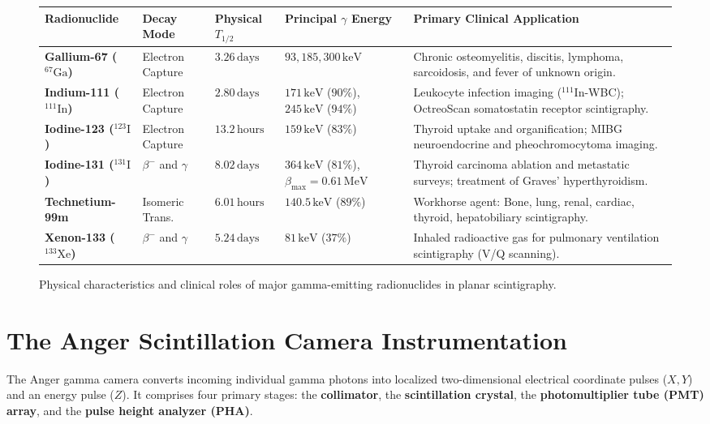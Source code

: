 \documentclass[11pt,a4paper]{article}
\begin{document}
\begin{figure}[htbp]
\centering
\setlength{\tabcolsep}{4pt}
\begin{tabular}{p{2.5cm}p{2.3cm}p{2.1cm}p{2.7cm}p{4.8cm}}
\toprule
\textbf{Radionuclide} & \textbf{Decay Mode} & \textbf{Physical $T_{1/2}$} & \textbf{Principal $\gamma$ Energy} & \textbf{Primary Clinical Application} \\
\midrule
\textbf{Gallium-67 ($^{67}\text{Ga}$)} & Electron Capture & $3.26\,\text{days}$ & $93, 185, 300\,\text{keV}$ & Chronic osteomyelitis, discitis, lymphoma, sarcoidosis, and fever of unknown origin. \\
\addlinespace
\textbf{Indium-111 ($^{111}\text{In}$)} & Electron Capture & $2.80\,\text{days}$ & $171\,\text{keV}$ ($90\%$), $245\,\text{keV}$ ($94\%$) & Leukocyte infection imaging ($^{111}\text{In}$-WBC); OctreoScan somatostatin receptor scintigraphy. \\
\addlinespace
\textbf{Iodine-123 ($^{123}\text{I}$)} & Electron Capture & $13.2\,\text{hours}$ & $159\,\text{keV}$ ($83\%$) & Thyroid uptake and organification; MIBG neuroendocrine and pheochromocytoma imaging. \\
\addlinespace
\textbf{Iodine-131 ($^{131}\text{I}$)} & $\beta^-$ and $\gamma$ & $8.02\,\text{days}$ & $364\,\text{keV}$ ($81\%$), $\beta_{\text{max}} = 0.61\,\text{MeV}$ & Thyroid carcinoma ablation and metastatic surveys; treatment of Graves' hyperthyroidism. \\
\addlinespace
\textbf{Technetium-99m} & Isomeric Trans. & $6.01\,\text{hours}$ & $140.5\,\text{keV}$ ($89\%$) & Workhorse agent: Bone, lung, renal, cardiac, thyroid, hepatobiliary scintigraphy. \\
\addlinespace
\textbf{Xenon-133 ($^{133}\text{Xe}$)} & $\beta^-$ and $\gamma$ & $5.24\,\text{days}$ & $81\,\text{keV}$ ($37\%$) & Inhaled radioactive gas for pulmonary ventilation scintigraphy (V/Q scanning). \\
\bottomrule
\end{tabular}
\caption{Physical characteristics and clinical roles of major gamma-emitting radionuclides in planar scintigraphy.}
\label{tab:radionuclides}
\end{figure}

\newpage
\section{The Anger Scintillation Camera Instrumentation}

The Anger gamma camera converts incoming individual gamma photons into localized two-dimensional electrical coordinate pulses ($X, Y$) and an energy pulse ($Z$). It comprises four primary stages: the \textbf{collimator}, the \textbf{scintillation crystal}, the \textbf{photomultiplier tube (PMT) array}, and the \textbf{pulse height analyzer (PHA)}.
\end{document}
